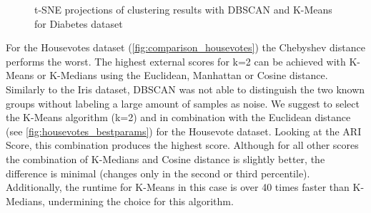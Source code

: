 \begin{figure}[H]
	\centering
	\caption{t-SNE projections of clustering results with DBSCAN and K-Means for Diabetes dataset}
	\label{fig:diabetestsne}
\end{figure}

For the Housevotes dataset (\autoref{fig:comparison_housevotes}) the Chebyshev distance performs the worst. The highest external scores for k=2 can be achieved with K-Means or K-Medians using the Euclidean, Manhattan or Cosine distance. Similarly to the Iris dataset, DBSCAN was not able to distinguish the two known groups without labeling a large amount of samples as noise. We suggest to select the K-Means algorithm (k=2) and in combination with the Euclidean distance (see \autoref{fig:housevotes_bestparams}) for the Housevote dataset. Looking at the ARI Score, this combination produces the highest score. Although for all other scores the combination of K-Medians and Cosine distance is slightly better, the difference is minimal (changes only in the second or third percentile). Additionally, the runtime for K-Means in this case is over 40 times faster than K-Medians, undermining the choice for this algorithm.

